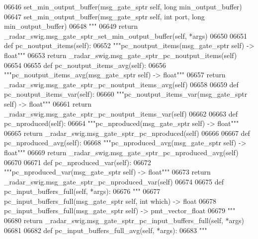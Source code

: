 \begin{DoxyCode}
{{{{{{{{{{{{{{{{{{{{{{06646 \textcolor{stringliteral}{        set\_min\_output\_buffer(msg\_gate\_sptr self, long min\_output\_buffer)}
06647 \textcolor{stringliteral}{        set\_min\_output\_buffer(msg\_gate\_sptr self, int port, long min\_output\_buffer)}
06648 \textcolor{stringliteral}{        """}
06649         \textcolor{keywordflow}{return} \_radar\_swig.msg\_gate\_sptr\_set\_min\_output\_buffer(self, *args)
06650 
06651     \textcolor{keyword}{def }pc_noutput_items(self):
06652         \textcolor{stringliteral}{"""pc\_noutput\_items(msg\_gate\_sptr self) -> float"""}
06653         \textcolor{keywordflow}{return} \_radar\_swig.msg\_gate\_sptr\_pc\_noutput\_items(self)
06654 
06655     \textcolor{keyword}{def }pc_noutput_items_avg(self):
06656         \textcolor{stringliteral}{"""pc\_noutput\_items\_avg(msg\_gate\_sptr self) -> float"""}
06657         \textcolor{keywordflow}{return} \_radar\_swig.msg\_gate\_sptr\_pc\_noutput\_items\_avg(self)
06658 
06659     \textcolor{keyword}{def }pc_noutput_items_var(self):
06660         \textcolor{stringliteral}{"""pc\_noutput\_items\_var(msg\_gate\_sptr self) -> float"""}
06661         \textcolor{keywordflow}{return} \_radar\_swig.msg\_gate\_sptr\_pc\_noutput\_items\_var(self)
06662 
06663     \textcolor{keyword}{def }pc_nproduced(self):
06664         \textcolor{stringliteral}{"""pc\_nproduced(msg\_gate\_sptr self) -> float"""}
06665         \textcolor{keywordflow}{return} \_radar\_swig.msg\_gate\_sptr\_pc\_nproduced(self)
06666 
06667     \textcolor{keyword}{def }pc_nproduced_avg(self):
06668         \textcolor{stringliteral}{"""pc\_nproduced\_avg(msg\_gate\_sptr self) -> float"""}
06669         \textcolor{keywordflow}{return} \_radar\_swig.msg\_gate\_sptr\_pc\_nproduced\_avg(self)
06670 
06671     \textcolor{keyword}{def }pc_nproduced_var(self):
06672         \textcolor{stringliteral}{"""pc\_nproduced\_var(msg\_gate\_sptr self) -> float"""}
06673         \textcolor{keywordflow}{return} \_radar\_swig.msg\_gate\_sptr\_pc\_nproduced\_var(self)
06674 
06675     \textcolor{keyword}{def }pc_input_buffers_full(self, *args):
06676         \textcolor{stringliteral}{"""}
06677 \textcolor{stringliteral}{        pc\_input\_buffers\_full(msg\_gate\_sptr self, int which) -> float}
06678 \textcolor{stringliteral}{        pc\_input\_buffers\_full(msg\_gate\_sptr self) -> pmt\_vector\_float}
06679 \textcolor{stringliteral}{        """}
06680         \textcolor{keywordflow}{return} \_radar\_swig.msg\_gate\_sptr\_pc\_input\_buffers\_full(self, *args)
06681 
06682     \textcolor{keyword}{def }pc_input_buffers_full_avg(self, *args):
06683         \textcolor{stringliteral}{"""}
}}}}}}}}}}}}}}}}}}}}}}
\end{DoxyCode}
